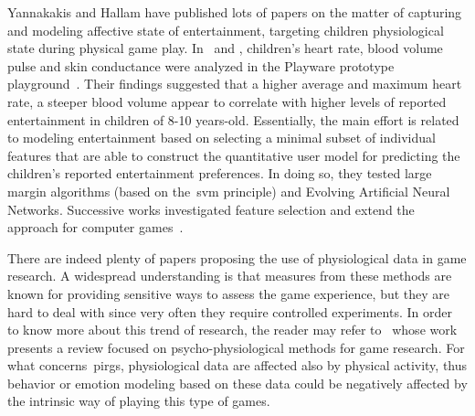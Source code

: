 Yannakakis and Hallam have published lots of papers on the matter of capturing and modeling affective state of entertainment, targeting children physiological state during physical game play. In~\cite{yannakakis_modeling_2006} and \cite{yannakakis_entertainment_2008}, children's heart rate, blood volume pulse and skin conductance were analyzed in the Playware prototype playground~\citep{lund_playware_2005}. Their findings suggested that a higher average and maximum heart rate, a steeper blood volume appear to correlate with higher levels of reported entertainment in children of 8-10 years-old. Essentially, the main effort is related to modeling entertainment based on selecting a minimal subset of individual features that are able to construct the quantitative user model for predicting the children's reported entertainment preferences. In doing so, they tested large margin algorithms (based on the~\gls{svm} principle) and Evolving Artificial Neural Networks. Successive works investigated feature selection and extend the approach for computer games~\citep{yannakakis_towards_2006,yannakakis_entertainment_2007,yannakakis_feature_2007,yannakakis_entertainment_2008-1}. 

There are indeed plenty of papers proposing the use of physiological data in game research. A widespread understanding is that measures from these methods are known for providing sensitive ways to assess the game experience, but they are hard to deal with since very often they require controlled experiments. In order to know more about this trend of research, the reader may refer to~\cite{kivikangas_review_2011} whose work presents a review focused on psycho-physiological methods for game research. For what concerns~\gls{pirg}s, physiological data are affected also by physical activity, thus behavior or emotion modeling based on these data could be negatively affected by the intrinsic way of playing this type of games.   
 
